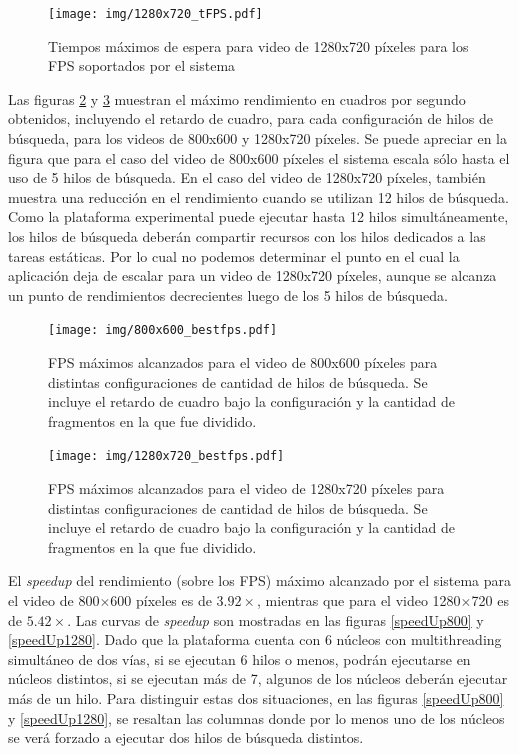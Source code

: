 \begin{figure}[!htb]

	\texttt{[image: img/1280x720\_tFPS.pdf]}
	\caption{Tiempos máximos de espera para video de 1280x720 píxeles para
	los FPS soportados por el sistema}
	\label{1280tFPS}

\end{figure}

Las figuras \ref{bestFPS800} y \ref{bestFPS1280} muestran el máximo rendimiento
en cuadros por segundo obtenidos, incluyendo el retardo de cuadro, para cada
configuración de hilos de búsqueda, para los videos de 800x600 y 1280x720
píxeles. Se puede apreciar en la figura que para el caso del video de 800x600
píxeles el sistema escala sólo hasta el uso de 5 hilos de búsqueda. En el caso
del video de 1280x720 píxeles, también muestra una reducción en el rendimiento
cuando se utilizan 12 hilos de búsqueda. Como la plataforma experimental puede
ejecutar hasta 12 hilos simultáneamente, los hilos de búsqueda deberán compartir
recursos con los hilos dedicados a las tareas estáticas. Por lo cual no podemos
determinar el punto en el cual la aplicación deja de escalar para un video de
1280x720 píxeles, aunque se alcanza un punto de rendimientos decrecientes luego
de los 5 hilos de búsqueda.

\begin{figure}[!htb]

	\texttt{[image: img/800x600\_bestfps.pdf]}
	\caption{FPS máximos alcanzados para el video de 800x600 píxeles para
	distintas configuraciones de cantidad de hilos de búsqueda. Se incluye
	el retardo de cuadro bajo la configuración y la cantidad de fragmentos
	en la que fue dividido.} \label{bestFPS800}

\end{figure}

\begin{figure}[!htb]

	\texttt{[image: img/1280x720\_bestfps.pdf]}
	\caption{FPS máximos alcanzados para el video de 1280x720 píxeles para
	distintas configuraciones de cantidad de hilos de búsqueda. Se incluye
	el retardo de cuadro bajo la configuración y la cantidad de fragmentos
	en la que fue dividido.}
	\label{bestFPS1280}

\end{figure}

El \emph{speedup} del rendimiento (sobre los FPS) máximo alcanzado por el
sistema para el video de 800$\times$600 píxeles es de $3.92\times$, mientras que
para el video 1280$\times$720 es de $5.42\times$. Las curvas de \emph{speedup}
son mostradas en las figuras \ref{speedUp800} y \ref{speedUp1280}. Dado que la
plataforma cuenta con 6 núcleos con multithreading simultáneo de dos vías, si se
ejecutan 6 hilos o menos, podrán ejecutarse en núcleos distintos, si se ejecutan
más de 7, algunos de los núcleos deberán ejecutar más de un hilo. Para
distinguir estas dos situaciones, en las figuras \ref{speedUp800} y
\ref{speedUp1280}, se resaltan las columnas donde por lo menos uno de los
núcleos se verá forzado a ejecutar dos hilos de búsqueda distintos.

